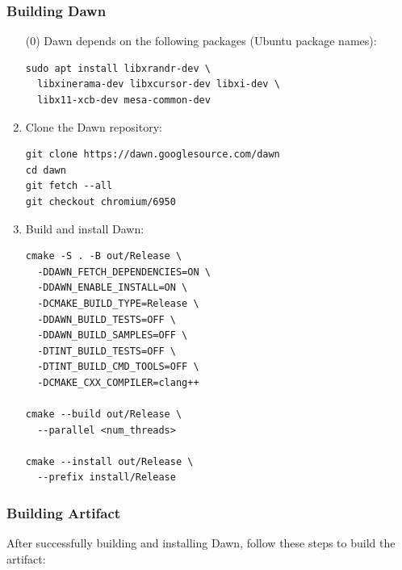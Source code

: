 \documentclass[sigconf]{acmart}
\begin{document}
\subsubsection{Building Dawn}
\begin{enumerate}
  \item[(0)] Dawn depends on the following packages (Ubuntu package names):
        \begin{lstlisting}[basicstyle=\ttfamily\small, frame=single]
sudo apt install libxrandr-dev \
  libxinerama-dev libxcursor-dev libxi-dev \
  libx11-xcb-dev mesa-common-dev
  \end{lstlisting}

  \item Clone the Dawn repository:
        \begin{lstlisting}[basicstyle=\ttfamily\small, frame=single]
git clone https://dawn.googlesource.com/dawn
cd dawn
git fetch --all
git checkout chromium/6950
  \end{lstlisting}

  \item Build and install Dawn:
        \begin{lstlisting}[basicstyle=\ttfamily\small, frame=single]
cmake -S . -B out/Release \
  -DDAWN_FETCH_DEPENDENCIES=ON \
  -DDAWN_ENABLE_INSTALL=ON \
  -DCMAKE_BUILD_TYPE=Release \
  -DDAWN_BUILD_TESTS=OFF \
  -DDAWN_BUILD_SAMPLES=OFF \
  -DTINT_BUILD_TESTS=OFF \
  -DTINT_BUILD_CMD_TOOLS=OFF \
  -DCMAKE_CXX_COMPILER=clang++

cmake --build out/Release \
  --parallel <num_threads>

cmake --install out/Release \
  --prefix install/Release
  \end{lstlisting}
\end{enumerate}

\subsubsection{Building Artifact}
After successfully building and installing Dawn, follow these steps to build the artifact:
\end{document}
